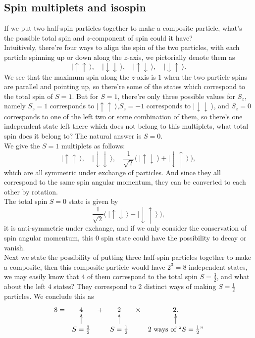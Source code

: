\documentclass{article}
\newcommand{\be}{\begin{equation}}
\newcommand{\ee}{\end{equation}}
\renewcommand{\1}{\left}
\renewcommand{\2}{\right}
\newcommand{\ra}{\rangle}
\begin{document}
\subsection{Spin multiplets and isospin}
If we put two half-spin particles together  to make a composite particle, what's the possible total spin and $z$-component of spin could it have?\\
Intuitively, there're four ways to align the spin of the two particles, with each particle spinning up or down along the $z$-axis, we pictorially denote them as
\be
|\uparrow\uparrow\ \ra,\quad |\downarrow\downarrow\ \ra,\quad |\uparrow\downarrow\ \ra,\quad |\downarrow\uparrow\ \ra.
\ee
We see that the maximum spin along the $z$-axis is $1$ when the two particle spins are parallel and pointing up, so there're some of the states which correspond to the total spin of $S=1$. But for $S=1$, there're only three possible values for $S_z$, namely $S_z=1$ corresponds to $|\uparrow\uparrow\ \ra$,$S_z=-1$ corresponds to $|\downarrow\downarrow\ \ra$, and $S_z=0$ corresponds to one of the left two or some combination of them, so there's one independent state left there which does not belong to this multiplets, what total spin does it belong to? The natural answer is $S=0$. \\
We give the $S=1$ multiplets as follows:
\be
|\uparrow\uparrow\ \ra,\quad |\downarrow\downarrow\ \ra,\quad \frac{1}{\sqrt{2}}\big(\ |\uparrow\downarrow\ \ra+ |\downarrow\uparrow\ \ra\ \big),
\ee
which are all symmetric under exchange of particles. And since they all correspond to the same spin  angular momentum,  they can be converted to each other by rotation. \\
The total spin $S=0$ state is given by
\be
\frac{1}{\sqrt{2}}\big(\ |\uparrow\downarrow\ \ra- |\downarrow\uparrow\ \ra\ \big),
\ee
it is anti-symmetric under exchange, and if we only consider the conservation of spin angular momentum, this $0$ spin state could have the possibility to decay or vanish.\\

Next we state the possibility of putting three half-spin particles together to make a composite, then this composite particle would have $2^3=8$ independent states, we may easily know  that $4$ of them correspond to the total spin $S=\frac 3 2$, and what about the left $4$ states? They correspond to $2$ distinct ways of making $S=\frac 1 2$ particles. We conclude this as
\be
\begin{gathered}
\xymatrix@R=3ex@C=1ex{
8=&4&+&2&\times& 2.\\
 &S=\frac 3 2\ar[u]&&S=\frac 1 2\ar[u]&& 2\ \text{ways of}\ ``S=\frac1 2"\ar[u]\\
}\end{gathered}
\ee
\end{document}

